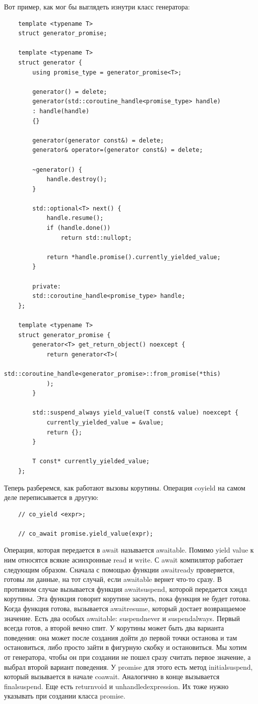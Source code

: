 \documentclass[12pt, a4paper]{article}
\begin{document}
Вот пример, как мог бы выглядеть изнутри класс генератора:
\begin{verbatim}
	template <typename T>
	struct generator_promise;
	
	template <typename T>
	struct generator {
		using promise_type = generator_promise<T>;
		
		generator() = delete;
		generator(std::coroutine_handle<promise_type> handle)
		: handle(handle)
		{}
		
		generator(generator const&) = delete;
		generator& operator=(generator const&) = delete;
		
		~generator() {
			handle.destroy();
		}
		
		std::optional<T> next() {
			handle.resume();
			if (handle.done())
				return std::nullopt;
			
			return *handle.promise().currently_yielded_value;
		}
		
		private:
		std::coroutine_handle<promise_type> handle;
	};
	
	template <typename T>
	struct generator_promise {
		generator<T> get_return_object() noexcept {
			return generator<T>(
			std::coroutine_handle<generator_promise>::from_promise(*this)
			);
		}
		
		std::suspend_always yield_value(T const& value) noexcept {
			currently_yielded_value = &value;
			return {};
		}
		
		T const* currently_yielded_value;
	};
\end{verbatim}
Теперь разберемся, как работают вызовы корутины. Операция co\textunderscore yield на самом деле переписывается в другую:
\begin{verbatim}
	// co_yield <expr>;
	
	// co_await promise.yield_value(expr);
\end{verbatim}
Операция, которая передается в await называется awaitable. Помимо yield value к ним относятся всякие асинхронные read и write. С await компилятор работает следующим образом. Сначала с помощью функции await\textunderscore ready проверяется, готовы ли данные, на тот случай, если awaitable вернет что-то сразу. В противном случае вызывается функция await\textunderscore suspend, которой передается хэндл корутины. Эта функция говорит корутине заснуть, пока функция не будет готова. Когда функция готова, вызывается await\textunderscore resume, который достает возвращаемое значение. Есть два особых awaitable: suspend\textunderscore never и suspend\textunderscore always. Первый всегда готов, а второй вечно спит. У корутины может быть два варианта поведения: она может после создания дойти до первой точки останова и там остановиться, либо просто зайти в фигурную скобку и остановиться. Мы хотим от генератора, чтобы он при создании не пошел сразу считать первое значение, а выбрал второй вариант поведения. У promise для этого есть метод initial\textunderscore suspend, который вызывается в начале co\textunderscore await. Аналогично в конце вызывается final\textunderscore suspend. Еще есть return\textunderscore void и unhandled\textunderscore expression. Их тоже нужно указывать при создании класса promise.\\
\end{document}
